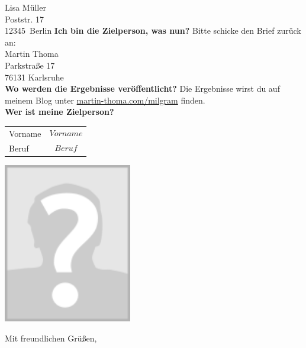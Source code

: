 \documentclass[a4paper, 12pt, KOMAold, sections]{scrlttr2}
\newcommand{\Empfaenger}{Lisa Müller} %
\newcommand{\EStrasse}{Poststr. 17}   %
\newcommand{\EPLZ}{12345}             %
\newcommand{\EOrt}{Berlin}            %
\newcommand{\section}[1]{\noindent\textbf{#1}\newline}
\begin{document}
\begin{letter}{\Empfaenger \\ \EStrasse \\ \EPLZ~\EOrt}
    \section{Ich bin die Zielperson, was nun?}
    Bitte schicke den Brief zurück an:\\

    \noindent Martin Thoma\\
    Parkstraße 17\\
    76131 Karlsruhe\\

    \section{Wo werden die Ergebnisse veröffentlicht?}
    Die Ergebnisse wirst du auf meinem Blog unter \href{http://martin-thoma.com/milgram}{martin-thoma.com/milgram}
    finden.\\

    \section{Wer ist meine Zielperson?}
    \begin{tabular}{ll}
    Vorname & $$Vorname$$\\
    Beruf   & $$Beruf$$\\
    \end{tabular}


    {\centering
    \includegraphics*[width=\linewidth,height=7cm,keepaspectratio]{Image_of_none.png} 
    }
 
    \closing{Mit freundlichen Grüßen,}
    \end{letter}
\end{document}
